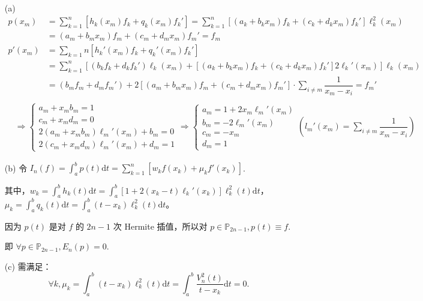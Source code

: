 \documentclass[lang=cn,a4paper,newtx,bibend=bibtex]{elegantpaper}
\newcommand{\dd}{\mathrm{d}}
\newcommand{\Int}[4]{\int_{#1}^{#2}{#3}{\dd {#4}}}
\begin{document}
\begin{solution}~~

  \begin{enumerate}
    \item[(a)] 
    \begin{equation*}
    \begin{aligned}
      p(x_m) &= \sum_{k = 1}^n\left[h_k(x_m)f_k+q_k(x_m)f_k'\right] = \sum_{k = 1}^n \left[(a_k+b_kx_m)f_k + (c_k +d_kx_m)f_k'\right]\ell_k^2(x_m) \\
      &= (a_m+b_mx_m)f_m + (c_m+d_mx_m)f_m' = f_m \\
      p'(x_m) &= \sum_{k = 1}{n}\left[h_k'(x_m)f_k + q_k'(x_m)f_k'\right] \\
      &= \sum_{k = 1}^n\left[(b_kf_k + d_kf_k')\ell_k(x_m)+[(a_k+b_kx_m)f_k + (c_k+d_kx_m)f_k']2\ell_k'(x_m)\right]\ell_k(x_m) \\
      &= (b_mf_m + d_mf_m') + 2\left[(a_m+b_mx_m)f_m + (c_m+d_mx_m)f_m'\right]\cdot \sum_{i\neq m}\dfrac{1}{x_m - x_i} = f_m' \\
    \end{aligned}
  \end{equation*}
  \begin{equation*}
    \begin{aligned}
      &\Rightarrow \begin{cases}
      a_m + x_m b_m = 1 \\
      c_m + x_m d_m = 0 \\
      2(a_m + x_m b_m) \ell_m'(x_m) + b_m = 0\\
      2(c_m + x_m d_m) \ell_m'(x_m) + d_m = 1
      \end{cases}
      \Rightarrow \begin{cases}
      a_m = 1 + 2x_m\ell_m'(x_m) \\
      b_m = -2\ell_m'(x_m) \\
      c_m = -x_m \\
      d_m = 1
      \end{cases}
      (l_m'(x_m) = \sum_{i\neq m}\dfrac{1}{x_m - x_i})
    \end{aligned}
    \end{equation*}
    \item[(b)]
    令 $I_n(f) = \Int{a}{b}{p(t)}{t} = \sum_{k = 1}^{n}\left[w_kf(x_k) + \mu_kf'(x_k)\right]$.
    
    其中，$w_k = \Int{a}{b}{h_k(t)}{t} = \Int{a}{b}{\left[1+2(x_k-t)\ell_k'(x_k)\right]\ell_k^2(t)}{t}$，
    $\mu_k = \Int{a}{b}{q_k(t)}{t} = \Int{a}{b}{(t-x_k)\ell_k^2(t)}{t}$。
    
    因为 $p(t)$ 是对 $f$ 的 $2n-1$ 次 Hermite 插值，所以对 $p\in \mathbb{P}_{2n-1}, p(t)\equiv f.$ 
    
    即 $\forall p\in \mathbb{P}_{2n-1}, E_n(p) = 0.$
    \item[(c)]
    需满足：
    \[\forall k, \mu_k = \Int{a}{b}{(t-x_k)\ell_k^2(t)}{t} = \Int{a}{b}{\dfrac{V_n^2(t)}{t-x_k}}{t} = 0.\]
  \end{enumerate}
\end{solution}
\end{document}
